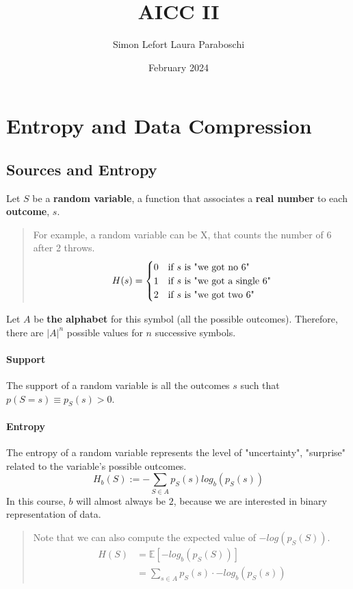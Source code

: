 \documentclass{article}
\title{AICC II}
\author{Simon Lefort Laura Paraboschi}
\date{February 2024}
\begin{document}
\maketitle

\section{Entropy and Data Compression}

\subsection{Sources and Entropy}

Let $ S $ be a \textbf{random variable}, a function that associates a \textbf{real number} to each \textbf{outcome}, $ s $.

\begin{quote}
    For example, a random variable can be X, that counts the number of $ 6 $ after 2 throws.
    \begin{equation}
        H(s) =
        \begin{cases}
            0 & \text{if $ s $ is "we got no 6"}\\
            1 & \text{if $ s $ is "we got a single 6"}\\
            2 & \text{if $ s $ is "we got two 6"}
        \end{cases}
    \end{equation}
\end{quote}
Let $ A $ be \textbf{the alphabet} for this symbol (all the possible outcomes). Therefore, there are $ |A|^n $ possible values for $ n $ successive symbols.
\paragraph{Support} The support of a random variable is all the outcomes $ s $ such that $ p(S = s) \equiv p_S(s) > 0 $.

\paragraph{Entropy} The entropy of a random variable represents the level of "uncertainty", "surprise" related to the variable's possible outcomes. 
\[ H_b(S) := - \sum_{S \in A} p_S(s)log_b(p_S(s))\]
In this course, $ b $ will almost always be $ 2 $, because we are interested in binary representation of data. 
\begin{quote}
    Note that we can also compute the expected value of $ -log(p_S(S)) $.
    \begin{equation} \label{eq1}
        \begin{split}
            H(S) & = \mathbb{E}[-log_b(p_S(S))] \\
            & = \sum_{s \in A} p_S(s) \cdot -log_b(p_S(s))
        \end{split}
    \end{equation}
\end{quote}
\end{document}
